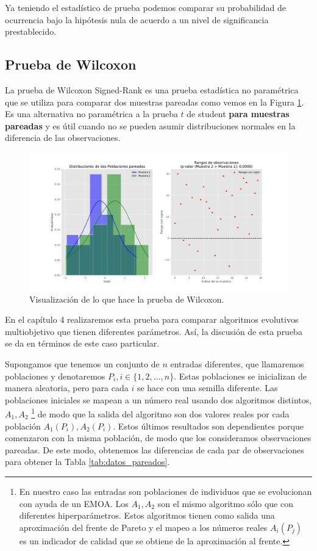Ya teniendo el estadístico de prueba podemos comparar su probabilidad de ocurrencia bajo la hipótesis nula de acuerdo a un nivel de significancia prestablecido. 

\subsection{Prueba de Wilcoxon} \label{sec:Wilcoxon}

La prueba de Wilcoxon Signed-Rank \cite{Wilcoxon} es una prueba estadística no paramétrica que se utiliza para comparar dos muestras pareadas como vemos en la Figura \ref{fig:Wilcoxon}. Es una alternativa no paramétrica a la prueba $t$ de student \cite{geisserStatisticalPrinciplesExperimental1963} \textbf{para muestras pareadas} y es útil cuando no se pueden asumir distribuciones normales en la diferencia de las observaciones. 

\begin{figure}[H]
    \centering
    \includegraphics[width=\textwidth]{Figuras/Wilcoxon_vis.pdf}
    \caption{Visualización de lo que hace la prueba de Wilcoxon.}
    \label{fig:Wilcoxon}
\end{figure}


En el capítulo 4 realizaremos esta prueba para comparar algoritmos evolutivos multiobjetivo que tienen diferentes parámetros. Así, la discusión de esta prueba se da en términos de este caso particular.

Supongamos que tenemos un conjunto de $n$ entradas diferentes, que llamaremos poblaciones y denotaremos $P_i, i\in\{1,2,\ldots,n\}$. Estas poblaciones se inicializan de manera aleatoria, pero para cada $i$ se hace con una semilla diferente. Las poblaciones iniciales se mapean a un número real usando dos algoritmos distintos, $A_1,A_2$ \footnote{En nuestro caso las entradas son poblaciones de individuos que se evolucionan con ayuda de un EMOA. Los $A_1,A_2$ son el mismo algoritmo sólo que con diferentes hiperparámetros. Estos algoritmos tienen como salida una aproximación del frente de Pareto y el mapeo a los números reales $A_i(P_j)$ es un indicador de calidad que se obtiene de la aproximación al frente.} de modo que la salida del algoritmo son dos valores reales por cada población $A_1(P_i), A_2(P_i)$. Estos últimos resultados son dependientes porque comenzaron con la misma población, de modo que los consideramos observaciones pareadas. De este modo, obtenemos las diferencias de cada par de observaciones para obtener la Tabla \ref{tab:datos_pareados}.

